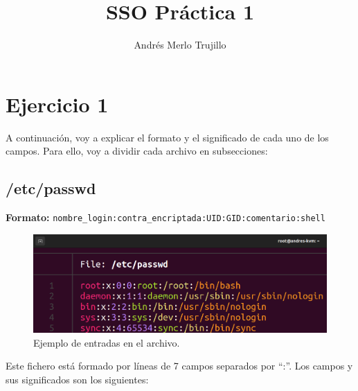 \documentclass{article}
\title{SSO Práctica 1}
\author{Andrés Merlo Trujillo}
\date{}
\begin{document}
\maketitle

\tableofcontents

\newpage
{}
\section*{Ejercicio 1}
A continuación, voy a explicar el formato y el significado de cada uno de los campos. Para ello, voy a dividir cada archivo en subsecciones:

\subsection*{/etc/passwd}
\textbf{Formato:} \verb|nombre_login:contra_encriptada:UID:GID:comentario:shell|

\begin{figure}[H]
    \includegraphics[width=\textwidth]{imagenes/passwdfile.png}
    \caption{Ejemplo de entradas en el archivo.}
\end{figure}

\bigskip

Este fichero está formado por líneas de 7 campos separados por ``:''. Los campos y sus significados son los siguientes:
\end{document}
